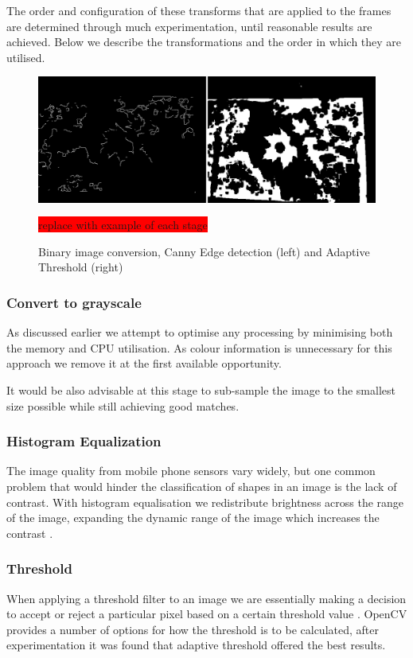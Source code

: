 The order and configuration of these transforms that are applied to the frames are determined through much experimentation, until reasonable  results are achieved. Below we describe the transformations and the order in which they are utilised.

\begin{figure}
\centering
    \includegraphics[width=1.0\textwidth]{leaf_identification/images/convert_to_binary.png}
    \caption{Binary image conversion, Canny Edge detection (left) and Adaptive Threshold (right)}%
    \label{preprocessing}
    \colorbox{red}{replace with example of each stage}
\end{figure}


\subsubsection{Convert to grayscale}
As discussed earlier we attempt to optimise any processing by minimising both the memory and CPU utilisation. As colour information is unnecessary for this approach we remove it at the first available opportunity.

It would be also advisable at this stage to sub-sample the image to the smallest size possible while still achieving good matches.

\subsubsection{Histogram Equalization}
The image quality from mobile phone sensors vary widely, but one common problem that would hinder the classification of shapes in an image is the lack of contrast. With histogram equalisation we redistribute brightness across the range of the image, expanding the dynamic range of the image which increases the contrast \cite{kuntz09}.


\subsubsection{Threshold}
When applying a threshold filter to an image we are essentially making a decision to accept or reject a particular pixel based on a certain threshold value \cite{bradski08}. OpenCV provides a number of options for how the threshold is to be calculated, after experimentation it was found that adaptive threshold offered the best results.

